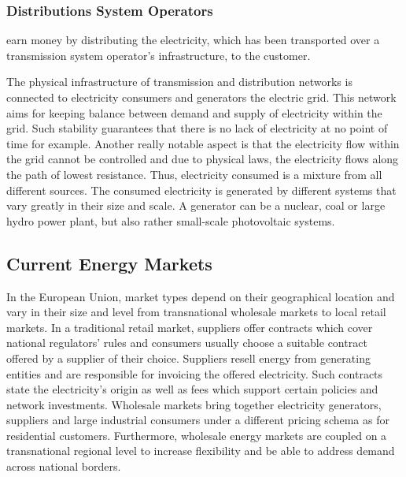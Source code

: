 \documentclass[runningheads]{llncs}
\begin{document}
\subsubsection{Distributions System Operators} earn money by distributing the electricity, which has been transported over a transmission system operator’s infrastructure, to the customer. \newline

The physical infrastructure of transmission and distribution networks is connected to electricity consumers and generators the electric grid. This network aims for keeping balance between demand and supply of electricity within the grid. Such stability guarantees that there is no lack of electricity at no point of time for example. Another really notable aspect is that the electricity flow within the grid cannot be controlled and due to physical laws, the electricity flows along the path of lowest resistance. Thus, electricity consumed is a mixture from all different sources.
The consumed electricity is generated by different systems that vary greatly in their size and scale. A generator can be a nuclear, coal or large hydro power plant, but also rather small-scale photovoltaic systems. \cite{eu_energy_market}

\subsection{Current Energy Markets}
In the European Union, market types depend on their geographical location and vary in their size and level from transnational wholesale markets to local retail markets. In a traditional retail market, suppliers offer contracts which cover national regulators’ rules and consumers usually choose a suitable contract offered by a supplier of their choice. Suppliers resell energy from generating entities and are responsible for invoicing the offered electricity. Such contracts state the electricity’s origin as well as fees which support certain policies and network investments.
Wholesale markets bring together electricity generators, suppliers and large industrial consumers under a different pricing schema as for residential customers. Furthermore, wholesale energy markets are coupled on a transnational regional level to increase flexibility and be able to address demand across national borders.\cite{eu_energy_market}
\end{document}
